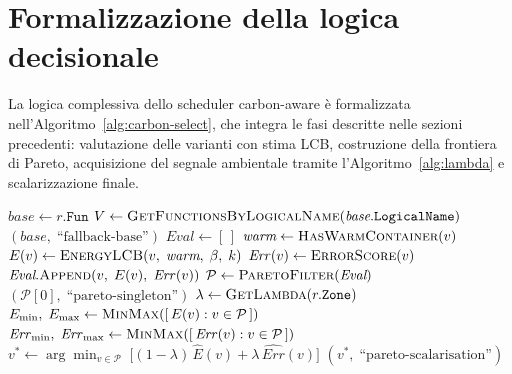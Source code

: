 \section{Formalizzazione della logica decisionale}
\label{sec:carbon:algoritmo}

La logica complessiva dello scheduler carbon-aware è formalizzata
nell'Algoritmo~\ref{alg:carbon-select}, che integra le fasi descritte
nelle sezioni precedenti: valutazione delle varianti con stima LCB,
costruzione della frontiera di Pareto, acquisizione del segnale
ambientale tramite l'Algoritmo~\ref{alg:lambda} e scalarizzazione
finale.

\begin{algorithm}[H]
\caption{\textsc{SelectParetoVariant}: selezione carbon-aware}
\label{alg:carbon-select}
\begin{algorithmic}[1]
    \State $\textit{base} \gets r.\texttt{Fun}$
    \State $V \gets \Call{GetFunctionsByLogicalName}
                        {\textit{base}.\texttt{LogicalName}}$
        \State \Return $(\textit{base},\;
               \text{``fallback-base''})$
    \EndIf
    \State
    \State {}
    \State $\textit{Eval} \gets [\,]$
        \State $\textit{warm} \gets \Call{HasWarmContainer}{v}$
        \State $E(v) \gets \Call{EnergyLCB}{v,\;\textit{warm},
                   \;\beta,\;k}$
        \State $\mathit{Err}(v) \gets \Call{ErrorScore}{v}$
        \State $\textit{Eval}.\textsc{Append}(v,\;E(v),
                   \;\mathit{Err}(v))$
    \EndFor
    \State
    \State {}
    \State $\mathcal{P} \gets \Call{ParetoFilter}{\textit{Eval}}$
        \State \Return $(\mathcal{P}[0],\;
               \text{``pareto-singleton''})$
    \EndIf
    \State
    \State {}
    \State $\lambda \gets \Call{GetLambda}{r.\texttt{Zone}}$
    \State
    \State {}
    \State $E_{\min},\; E_{\max} \gets \Call{MinMax}
               {[\,E(v) : v \in \mathcal{P}\,]}$
    \State $\mathit{Err}_{\min},\; \mathit{Err}_{\max} \gets
           \Call{MinMax}
               {[\,\mathit{Err}(v) : v \in \mathcal{P}\,]}$
    \State $v^* \gets \displaystyle\arg\min_{v \in \mathcal{P}}\;
           \bigl[(1-\lambda)\,\hat{E}(v) +
                  \lambda\,\widehat{\mathit{Err}}(v)\bigr]$
    \State \Return $(v^*,\; \text{``pareto-scalarisation''})$
\EndFunction
\end{algorithmic}
\end{algorithm}

